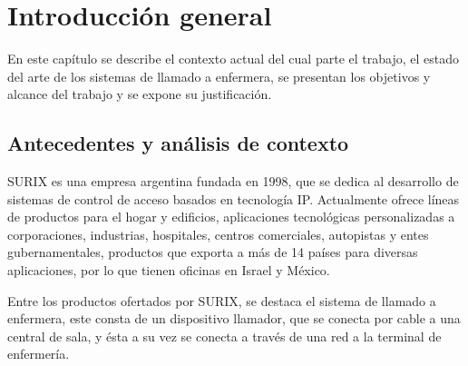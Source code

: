 
\chapter{Introducción general} %

\label{Chapter1} %

En este capítulo se describe el contexto actual del cual parte el trabajo, el estado del arte de los sistemas de llamado a enfermera, se presentan los objetivos y alcance del trabajo y se expone su justificación.

\label{IntroGeneral}


\newcommand{\keyword}[1]{\textbf{#1}}
\newcommand{\tabhead}[1]{\textbf{#1}}
\newcommand{\code}[1]{\texttt{#1}}
\newcommand{\file}[1]{\texttt{\bfseries#1}}
\newcommand{\option}[1]{\texttt{\itshape#1}}
\newcommand{\grados}{$^{\circ}$}



\section{Antecedentes y análisis de contexto}

SURIX es una empresa argentina fundada en 1998, que se dedica al desarrollo de sistemas de control de acceso basados en tecnología IP. Actualmente ofrece líneas de productos para el hogar y edificios, aplicaciones tecnológicas personalizadas a corporaciones, industrias, hospitales, centros comerciales, autopistas y entes gubernamentales, productos que exporta a más de 14 países para diversas aplicaciones, por lo que tienen oficinas en Israel y México.

Entre los productos ofertados por SURIX, se destaca el sistema de llamado a enfermera, este consta de un dispositivo llamador, que se conecta por cable a una central de sala, y ésta a su vez se conecta a través de una red a la terminal de enfermería.

